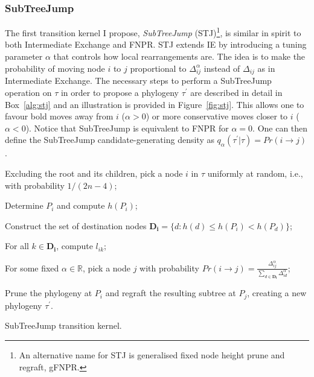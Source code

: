 \subsubsection*{SubTreeJump} 

The first transition kernel I propose, \textit{SubTreeJump} (STJ)\footnote{An alternative name for STJ is generalised fixed node height prune and regraft, gFNPR.}, is similar in spirit to both Intermediate Exchange and FNPR.
STJ extends IE by introducing a tuning parameter $\alpha$ that controls how local rearrangements are.
The idea is to make the probability of moving node $i$ to $j$ proportional to $\Delta_{ij}^\alpha$ instead of $\Delta_{ij}$ as in Intermediate Exchange.
The necessary steps to perform a SubTreeJump operation on $\tau$ in order to propose a phylogeny $\tau^\prime$ are described in detail in Box~\ref{alg:stj} and an illustration is provided in Figure~\ref{fig:stj}.
This allows one to favour bold moves away from $i$ ($\alpha > 0$) or more conservative moves closer to $i$ ($\alpha < 0$).
Notice that SubTreeJump is equivalent to FNPR for $\alpha = 0$.
One can then define the SubTreeJump candidate-generating density as $q_{\alpha}(\tau^\prime | \tau) = Pr(i\to j)$.

\begin{algorithm}[!ht]

\setcounter{AlgoLine}{-1}

 Excluding the root and its children, pick a node $i$ in  $\tau$ uniformly at random, i.e., with probability $1/(2n-4)$;
 
 Determine $P_i$ and compute $h(P_i)$;
 
 Construct the set of destination nodes $\mathbf{D_i} = \{ d : h(d) \leq h(P_i) < h(P_d) \}$;
 
 For all $k \in \mathbf{D_i}$, compute $l_{ik}$;
 
 For some fixed $\alpha \in \mathbb{R}$, pick a node $j$ with probability $Pr(i\to j) = \frac{\Delta_{ij}^{\alpha}}{\sum_{d \in \mathbf{D_i}}\Delta_{id}^{\alpha}}$;
 
 Prune the phylogeny at $P_i$ and regraft the resulting subtree at $P_j$, creating a new phylogeny $\tau^\prime$. 
 
 \caption{SubTreeJump transition kernel.}
 \label{alg:stj}
\end{algorithm}

